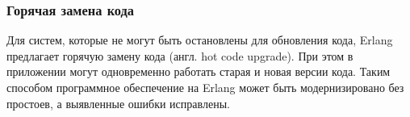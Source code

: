 \documentclass[12pt]{article}
\begin{document}
\subsubsection*{Горячая замена кода}
Для систем, которые не могут быть остановлены для обновления кода, Erlang предлагает горячую замену кода (англ. hot code upgrade). При этом в приложении могут одновременно работать старая и новая версии кода. Таким способом программное обеспечение на Erlang может быть модернизировано без простоев, а выявленные ошибки исправлены.
\end{document}
